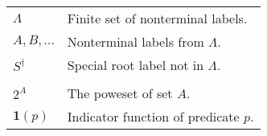 \begin{table}[h]
\begin{tabular}{ll}
    $\Lambda$ & Finite set of nonterminal labels.  \\
    $A, B, \dots$ & Nonterminal labels from $\Lambda$.  \\
    $S^{\dagger}$ & Special root label not in $\Lambda$.  \\
    & \\

    $2^A$ & The poweset of set $A$.  \\
    $\mathbf{1}(p)$  & Indicator function of predicate $p$.  \\

  \end{tabular}

\end{table}

% 
